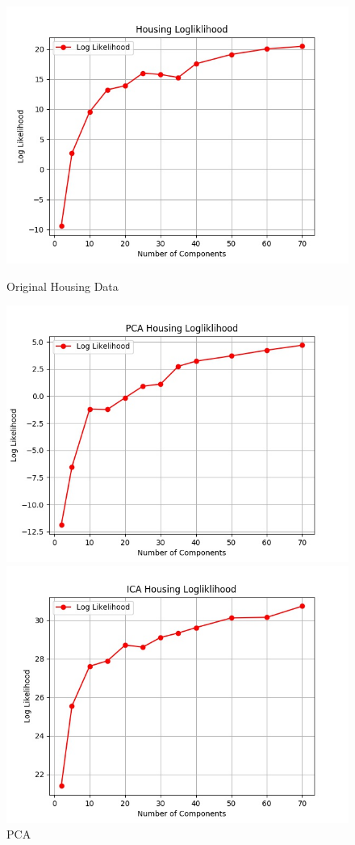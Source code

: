 \documentclass[h]{article}
\begin{document}
 \begin{figure}[H]
      \includegraphics[width=1\textwidth,keepaspectratio]{housing_logliklihood.jpg} 
      \caption*{Original Housing Data} 
   \endminipage\hfill
      \includegraphics[width=1\textwidth,keepaspectratio]{pca_housing_logliklihood.jpg} 
      \caption*{PCA} 
   \endminipage\hfill
      \includegraphics[width=1\textwidth,keepaspectratio]{ica_housing_logliklihood.jpg} 

\end{figure}
\end{document}
